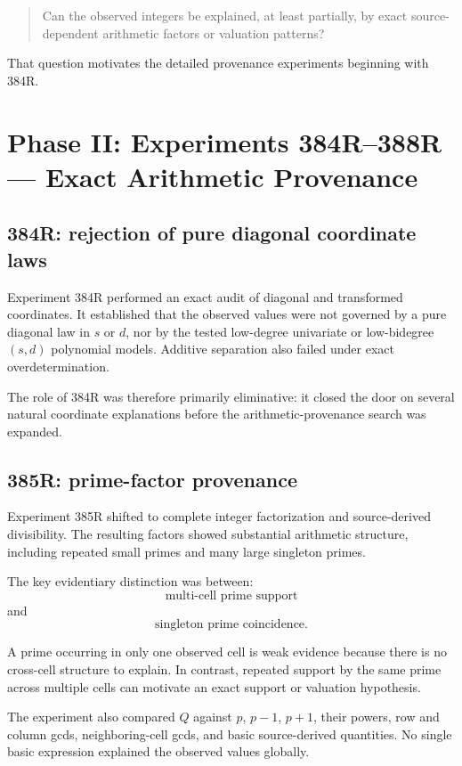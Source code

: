 \documentclass[11pt,a4paper]{article}
\begin{document}
\begin{quote}
Can the observed integers be explained, at least partially, by exact source-dependent arithmetic factors or valuation patterns?
\end{quote}

That question motivates the detailed provenance experiments beginning with 384R.

\section{Phase II: Experiments 384R--388R --- Exact Arithmetic Provenance}

\subsection{384R: rejection of pure diagonal coordinate laws}

Experiment 384R performed an exact audit of diagonal and transformed coordinates. It established that the observed values were not governed by a pure diagonal law in $s$ or $d$, nor by the tested low-degree univariate or low-bidegree $(s,d)$ polynomial models. Additive separation also failed under exact overdetermination.

The role of 384R was therefore primarily eliminative: it closed the door on several natural coordinate explanations before the arithmetic-provenance search was expanded.

\subsection{385R: prime-factor provenance}

Experiment 385R shifted to complete integer factorization and source-derived divisibility. The resulting factors showed substantial arithmetic structure, including repeated small primes and many large singleton primes.

The key evidentiary distinction was between:
\[
\text{multi-cell prime support}
\]
and
\[
\text{singleton prime coincidence}.
\]

A prime occurring in only one observed cell is weak evidence because there is no cross-cell structure to explain. In contrast, repeated support by the same prime across multiple cells can motivate an exact support or valuation hypothesis.

The experiment also compared $Q$ against $p$, $p-1$, $p+1$, their powers, row and column gcds, neighboring-cell gcds, and basic source-derived quantities. No single basic expression explained the observed values globally.
\end{document}
